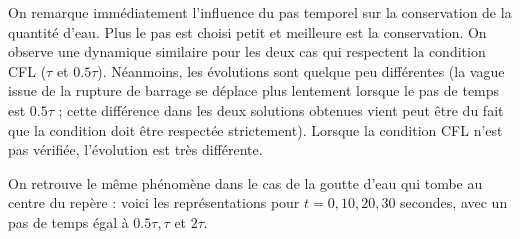 \documentclass[
11pt, %
francais, %
singlespacing, %
headsepline, %
]{MastersDoctoralThesis} %
\theoremstyle{definition}
\begin{document}
On remarque immédiatement l'influence du pas temporel sur la conservation de la quantité d'eau. Plus le pas est choisi petit et meilleure est la conservation. On observe une dynamique similaire pour les deux cas qui respectent la condition CFL ($\tau$ et $0.5\tau$). Néanmoins, les évolutions sont quelque peu différentes (la vague issue de la rupture de barrage se déplace plus lentement lorsque le pas de temps est $0.5\tau$ ; cette différence dans les deux solutions obtenues vient peut être du fait que la condition doit être respectée strictement). Lorsque la condition CFL n'est pas vérifiée, l'évolution est très différente.


On retrouve le même phénomène dans le cas de la goutte d'eau qui tombe au centre du repère : voici les représentations pour $t=0, 10, 20, 30$ secondes, avec un pas de temps égal à $0.5\tau, \tau$ et $2\tau$.
\end{document}
